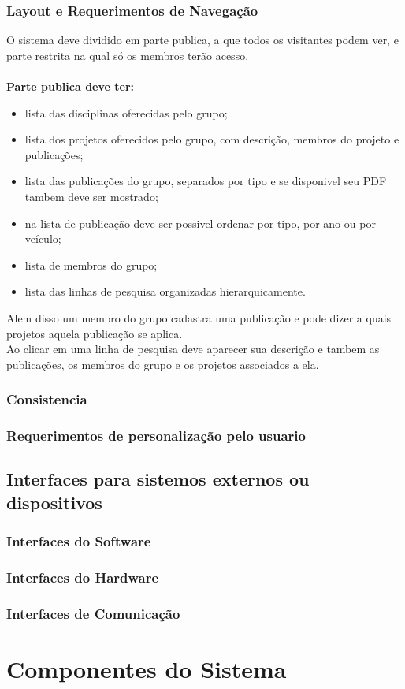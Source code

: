 \documentclass[11pt, a4paper]{article}
\begin{document}
			\subsubsection{Layout e Requerimentos de Navegação}
				O sistema deve dividido em parte publica, a que todos os 
				visitantes podem ver, e parte restrita na qual só os membros 
				terão acesso.\\
				\\
				\noindent \textbf{Parte publica deve ter:}
				\begin{itemize}
					\item lista das disciplinas oferecidas pelo grupo;
					\item lista dos projetos oferecidos pelo grupo, com 
					descrição, membros do projeto e publicações;
					\item lista das publicações do grupo, separados por tipo e 
					se disponivel seu PDF tambem deve ser mostrado;
					\item na lista de publicação deve ser possivel ordenar por 
					tipo, por ano ou por veículo;
					\item lista de  membros do grupo;
					\item lista das linhas de pesquisa organizadas 
					hierarquicamente.
				\end{itemize}
				
				\indent Alem disso um membro do grupo cadastra uma publicação e
				pode dizer a quais projetos aquela publicação se aplica.\\
				\indent Ao clicar em uma linha de pesquisa deve aparecer sua 
				descrição e tambem as publicações, os membros do grupo e os 
				projetos associados a ela.
							
			\subsubsection{Consistencia}

			\subsubsection{Requerimentos de personalização pelo usuario}

		\subsection{Interfaces para sistemos externos ou dispositivos}
			\subsubsection{Interfaces do Software}
			
			\subsubsection{Interfaces do Hardware}
			
			\subsubsection{Interfaces de Comunicação}
			
	\section{Componentes do Sistema}
\end{document}
